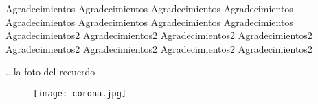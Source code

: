 	
	\vspace{6cm}
\begin{flushright}
		Agradecimientos	Agradecimientos	Agradecimientos	Agradecimientos\\	Agradecimientos	Agradecimientos Agradecimientos	Agradecimientos\\
	\vspace{3cm}
	Agradecimientos2	Agradecimientos2 Agradecimientos2	Agradecimientos2 Agradecimientos2	Agradecimientos2 Agradecimientos2	Agradecimientos2
\end{flushright}
\newpage
\vspace*{6cm}
\begin{flushright}
	...la foto del recuerdo
\end{flushright}
	
\begin{figure}[htb]
	\centering
	\texttt{[image: corona.jpg]}
	\label{fig:corona}
\end{figure}


\newpage
